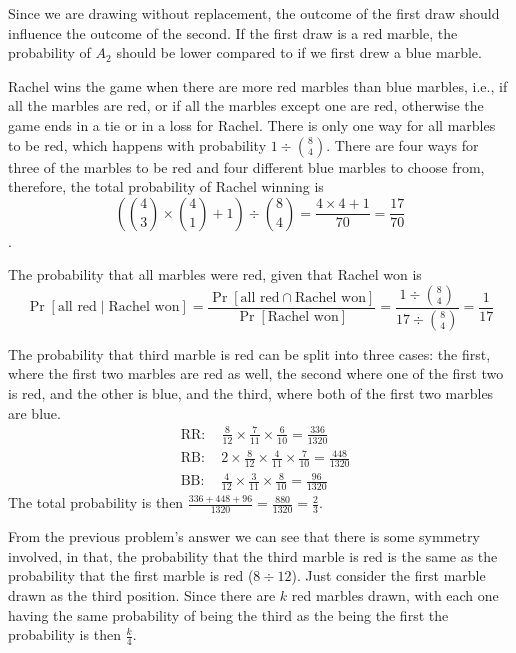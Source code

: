 \documentclass[11pt]{article}
\begin{document}
\begin{solution}
    
\begin{Parts}
    
\Part Since we are drawing without replacement, the outcome of the first draw 
should influence the outcome of the second. If the first draw is a red marble,
the probability of $A_2$ should be lower compared to if we first drew a blue
marble. 

\Part Rachel wins the game when there are more red marbles than blue marbles,
i.e., if all the marbles are red, or if all the marbles except one are red, 
otherwise the game ends in a tie or in a loss for Rachel. There is only one 
way for all marbles to be red, which happens with probability $1 \div \binom{8}{4}$.
There are four ways for three of the marbles to be red and four different blue marbles
to choose from, therefore, the total probability of Rachel winning is 
$$\left( \binom{4}{3} \times \binom{4}{1} + 1 \right)  \div \binom{8}{4} = 
\frac{4 \times 4 + 1}{70} = \frac{17}{70}$$.

\Part The probability that all marbles were red, given that Rachel won is
\[
    \Pr[\text{all red} \mid \text{Rachel won}] = \frac{\Pr[\text{all red} \cap \text{Rachel won}]}
    {\Pr[\text{Rachel won}]} = \frac{1 \div \binom{8}{4}}{17 \div \binom{8}{4}} = \frac{1}{17}
\]

\Part The probability that third marble is red can be split into three cases: 
the first, where the first two marbles are red as well, the second where one 
of the first two is red, and the other is blue, and the third, where both of 
the first two marbles are blue. 
\[
    \begin{split}
        &\text{RR}: \quad \frac{8}{12} \times \frac{7}{11} \times \frac{6}{10} = \frac{336}{1320} \\
        &\text{RB}: \quad 2 \times \frac{8}{12} \times \frac{4}{11} \times \frac{7}{10} = \frac{448}{1320} \\
        &\text{BB}: \quad \frac{4}{12} \times \frac{3}{11} \times \frac{8}{10} = \frac{96}{1320}
    \end{split}
\]
The total probability is then $\frac{336+448+96}{1320} = \frac{880}{1320} = \frac{2}{3}$.

\Part From the previous problem's answer we can see that there is some symmetry
involved, in that, the probability that the third marble is red is the same as 
the probability that the first marble is red ($8 \div 12$). Just consider the 
first marble drawn as the third position. Since there are $k$ red marbles drawn,
with each one having the same probability of being the third as the being the first
the probability is then $\frac{k}{4}$. 


\end{Parts}
\end{solution}
\end{document}
